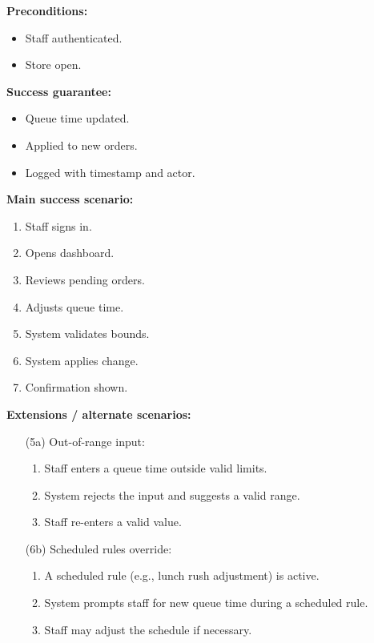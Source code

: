 \documentclass{article}
\begin{document}
\textbf{Preconditions:}
\begin{itemize}
    \item Staff authenticated.
    \item Store open.
\end{itemize}

\textbf{Success guarantee:}
\begin{itemize}
    \item Queue time updated.
    \item Applied to new orders.
    \item Logged with timestamp and actor.
\end{itemize}

\textbf{Main success scenario:}
\begin{enumerate}
    \item Staff signs in.
    \item Opens dashboard.
    \item Reviews pending orders.
    \item Adjusts queue time.
    \item System validates bounds.
    \item System applies change.
    \item Confirmation shown.
\end{enumerate}

\textbf{Extensions / alternate scenarios:}
\begin{itemize}

    \item[(5a)] Out-of-range input:
    \begin{enumerate}
        \item Staff enters a queue time outside valid limits.
        \item System rejects the input and suggests a valid range.
        \item Staff re-enters a valid value.
    \end{enumerate}


    \item[(6b)] Scheduled rules override:
    \begin{enumerate}
        \item A scheduled rule (e.g., lunch rush adjustment) is active.
        \item System prompts staff for new queue time during a scheduled rule.
        \item Staff may adjust the schedule if necessary.
    \end{enumerate}
\end{itemize}
\end{document}
